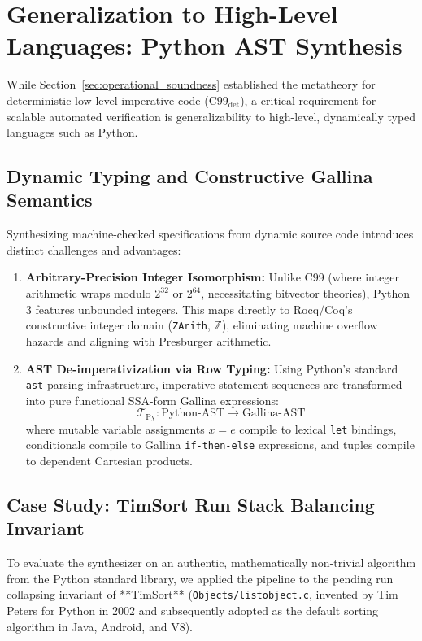\documentclass[10pt,journal,compsoc]{IEEEtran}
\begin{document}
\section{Generalization to High-Level Languages: Python AST Synthesis}
\label{sec:general_languages}

While Section~\ref{sec:operational_soundness} established the metatheory for deterministic low-level imperative code ($\text{C99}_{\text{det}}$), a critical requirement for scalable automated verification is generalizability to high-level, dynamically typed languages such as Python.

\subsection{Dynamic Typing and Constructive Gallina Semantics}
Synthesizing machine-checked specifications from dynamic source code introduces distinct challenges and advantages:
\begin{enumerate}
    \item \textbf{Arbitrary-Precision Integer Isomorphism:} Unlike C99 (where integer arithmetic wraps modulo $2^{32}$ or $2^{64}$, necessitating bitvector theories), Python 3 features unbounded integers. This maps directly to Rocq/Coq's constructive integer domain (\texttt{ZArith}, $\mathbb{Z}$), eliminating machine overflow hazards and aligning with Presburger arithmetic.
    \item \textbf{AST De-imperativization via Row Typing:} Using Python's standard \texttt{ast} parsing infrastructure, imperative statement sequences are transformed into pure functional SSA-form Gallina expressions:
    \begin{equation}
    \mathcal{T}_{\text{Py}} : \text{Python-AST} \to \text{Gallina-AST}
    \end{equation}
    where mutable variable assignments $x = e$ compile to lexical \texttt{let} bindings, conditionals compile to Gallina \texttt{if-then-else} expressions, and tuples compile to dependent Cartesian products.
\end{enumerate}

\subsection{Case Study: TimSort Run Stack Balancing Invariant}
To evaluate the synthesizer on an authentic, mathematically non-trivial algorithm from the Python standard library, we applied the pipeline to the pending run collapsing invariant of **TimSort** (\texttt{Objects/listobject.c}, invented by Tim Peters for Python in 2002 and subsequently adopted as the default sorting algorithm in Java, Android, and V8).
\end{document}
